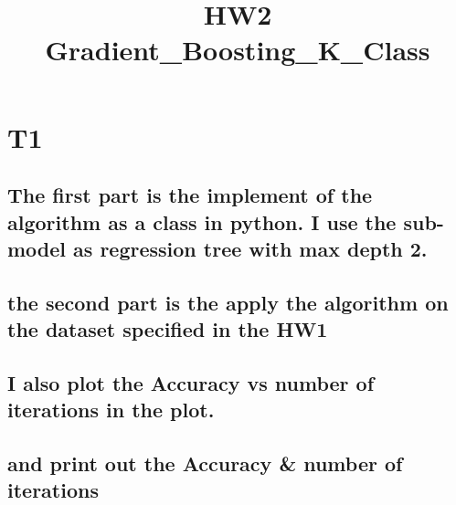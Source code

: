 \documentclass[11pt]{article}
\title{HW2 Gradient\_Boosting\_K\_Class}
\begin{document}
    
    
    \maketitle
    
    

    
    \hypertarget{t1}{%
\section{T1}\label{t1}}

\hypertarget{the-first-part-is-the-implement-of-the-algorithm-as-a-class-in-python.-i-use-the-sub-model-as-regression-tree-with-max-depth-2.}{%
\subsection{The first part is the implement of the algorithm as a class
in python. I use the sub-model as regression tree with max depth
2.}\label{the-first-part-is-the-implement-of-the-algorithm-as-a-class-in-python.-i-use-the-sub-model-as-regression-tree-with-max-depth-2.}}

\hypertarget{the-second-part-is-the-apply-the-algorithm-on-the-dataset-specified-in-the-hw1}{%
\subsection{the second part is the apply the algorithm on the dataset
specified in the
HW1}\label{the-second-part-is-the-apply-the-algorithm-on-the-dataset-specified-in-the-hw1}}

\hypertarget{i-also-plot-the-accuracy-vs-number-of-iterations-in-the-plot.}{%
\subsection{I also plot the Accuracy vs number of iterations in the
plot.}\label{i-also-plot-the-accuracy-vs-number-of-iterations-in-the-plot.}}

\hypertarget{and-print-out-the-accuracy-number-of-iterations}{%
\subsection{and print out the Accuracy \& number of
iterations}\label{and-print-out-the-accuracy-number-of-iterations}}
\end{document}
